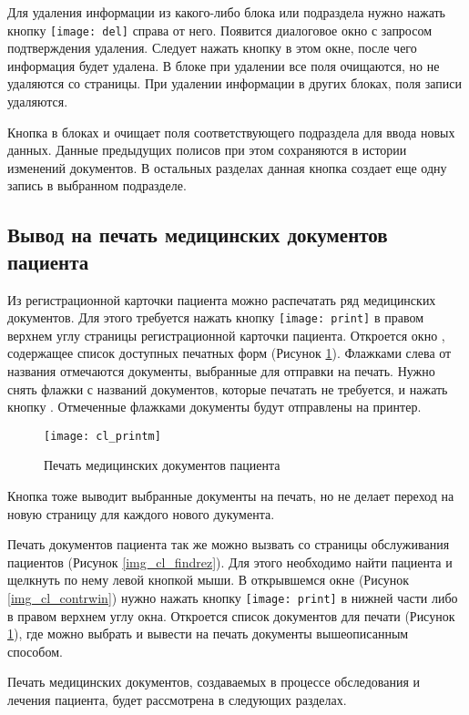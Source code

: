 Для удаления информации из какого-либо блока или подраздела нужно нажать кнопку \texttt{[image: del]} справа от  него. Появится диалоговое окно с запросом подтверждения удаления. Следует нажать кнопку  в этом окне, после чего информация будет удалена. В блоке  при удалении все поля очищаются, но не удаляются со страницы. При удалении информации в других блоках, поля записи удаляются.

Кнопка  в блоках  и  очищает поля соответствующего подраздела для ввода новых данных. Данные предыдущих полисов при этом сохраняются в истории изменений документов. В остальных разделах данная кнопка создает еще одну запись в выбранном подразделе.

\subsection{Вывод на печать медицинских документов пациента}

Из регистрационной карточки пациента можно распечатать ряд медицинских документов. Для этого требуется нажать кнопку \texttt{[image: print]} в правом верхнем углу страницы регистрационной карточки пациента. Откроется окно , содержащее список доступных печатных форм (Рисунок \ref{img_cl_printm}). Флажками слева от названия отмечаются документы, выбранные для отправки на печать. Нужно снять флажки с названий документов, которые печатать не требуется, и нажать кнопку . Отмеченные флажками документы будут отправлены на принтер.

\begin{figure}[ht]\centering
 \texttt{[image: cl\_printm]}
 \caption{Печать медицинских документов пациента}
 \label{img_cl_printm}
\end{figure} 

Кнопка  тоже выводит выбранные документы на печать, но не делает переход на новую страницу для каждого нового дукумента.

Печать документов пациента так же можно вызвать со страницы обслуживания пациентов (Рисунок \ref{img_cl_findrez}). Для этого необходимо найти пациента и щелкнуть по нему левой кнопкой мыши. В открывшемся окне (Рисунок \ref{img_cl_contrwin}) нужно нажать кнопку \texttt{[image: print]} в нижней части либо в правом верхнем углу окна. Откроется список документов для печати (Рисунок \ref{img_cl_printm}), где можно выбрать и вывести на печать документы вышеописанным способом. 
   
Печать медицинских документов, создаваемых в процессе обследования и лечения пациента, будет рассмотрена в следующих разделах.

